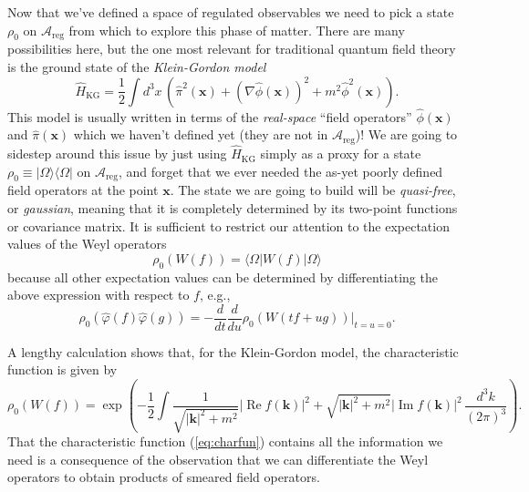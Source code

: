 \documentclass[11pt]{amsart}
\DeclareMathOperator{\im}{Im}
\DeclareMathOperator{\re}{Re}
\theoremstyle{plain}%
\theoremstyle{definition}
\theoremstyle{remark}
\begin{document}
Now that we've defined a space of regulated observables we need to pick a state $\rho_0$ on $\mathcal{A}_{\text{reg}}$ from which to explore this phase of matter. There are many possibilities here, but the one most relevant for traditional quantum field theory is the ground state of the \emph{Klein-Gordon model}
\begin{equation}
	\widehat{H}_{\text{KG}} = \frac12\int d^3 {x}\, \left(\widehat{\pi}^2(\mathbf{x}) + (\nabla \widehat{\phi}(\mathbf{x}))^2 + m^2 \widehat{\phi}^2(\mathbf{x})\right).
\end{equation}
This model is usually written in terms of the \emph{real-space} ``field operators'' $\widehat{\phi}(\mathbf{x})$ and $\widehat{\pi}(\mathbf{x})$ which we haven't defined yet (they are not in $\mathcal{A}_{\text{reg}}$)! We are going to sidestep around this issue by just using $\widehat{H}_{\text{KG}}$ simply as a proxy for a state $\rho_0 \equiv |\Omega\rangle\langle \Omega|$ on $\mathcal{A}_{\text{reg}}$, and forget that we ever needed the as-yet poorly defined field operators at the point $\mathbf{x}$. The state we are going to build will be \emph{quasi-free}, or \emph{gaussian}, meaning that it is completely determined by its two-point functions or covariance matrix. It is sufficient to restrict our attention to the expectation values of the Weyl operators 
\begin{equation}\label{eq:charfun}
	\rho_0(W(f)) = \langle \Omega|W(f)|\Omega\rangle
\end{equation}
because all other expectation values can be determined by differentiating the above expression with respect to $f$, e.g., 
\begin{equation}\label{eq:charfun}
	\rho_0(\widehat{\varphi}(f)\widehat{\varphi}(g)) = -\frac{d}{dt}\frac{d}{du}\rho_0(W(tf+ug))\bigg|_{t=u=0}.
\end{equation}

A lengthy calculation shows that, for the Klein-Gordon model, the characteristic function is given by
\begin{equation}
	\rho_0(W(f)) = \exp\left(-\frac{1}{2}\int \frac{1}{\sqrt{|\mathbf{k}|^2 + m^2}}|\re{f}(\mathbf{k})|^2 + \sqrt{|\mathbf{k}|^2 + m^2}|\im{f}(\mathbf{k})|^2 \,\frac{d^3k}{(2\pi)^3} \right).
\end{equation}
That the characteristic function (\ref{eq:charfun}) contains all the information we need is a consequence of the observation that we can differentiate the Weyl operators to obtain products of smeared field operators.
\end{document}
